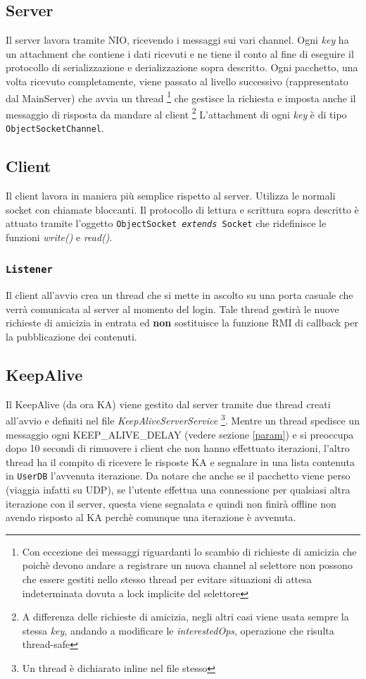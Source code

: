 \documentclass[]{article}
\begin{document}
\subsection{Server}
Il server lavora tramite NIO, ricevendo i messaggi sui vari channel. Ogni \textit{key} ha un attachment che contiene i dati ricevuti e ne tiene il conto al fine di eseguire il protocollo di serializzazione e derializzazione sopra descritto. Ogni pacchetto, una volta ricevuto completamente, viene passato al livello successivo (rappresentato dal MainServer) che avvia un thread \footnote{Con eccezione dei messaggi riguardanti lo scambio di richieste di amicizia che poichè devono andare a registrare un nuova channel al selettore non possono che essere gestiti nello stesso thread per evitare situazioni di attesa indeterminata dovuta a lock implicite del selettore} che gestisce la richiesta e imposta anche il messaggio di risposta da mandare al client \footnote{A differenza delle richieste di amicizia, negli altri casi viene usata sempre la stessa \textit{key}, andando a modificare le \textit{interestedOps}, operazione che risulta thread-safe}
L'attachment di ogni \textit{key} è di tipo \texttt{ObjectSocketChannel}.

\subsection{Client}
Il client lavora in maniera più semplice rispetto al server. Utilizza le normali socket con chiamate bloccanti. Il protocollo di lettura e scrittura sopra descritto è attuato tramite l'oggetto \texttt{ObjectSocket \textit{extends} Socket} che ridefinisce le funzioni \textit{write()} e \textit{read()}.
\subsubsection{\texttt{Listener}}
Il client all'avvio crea un thread che si mette in ascolto su una porta casuale che verrà comunicata al server al momento del login. Tale thread gestirà le nuove richieste di amicizia in entrata ed \textbf{non} sostituisce la funzione RMI di callback per la pubblicazione dei contenuti.

\subsection{KeepAlive}
Il KeepAlive (da ora KA) viene gestito dal server tramite due thread creati all'avvio e definiti nel file \textit{KeepAliveServerService} \footnote{Un thread è dichiarato inline nel file stesso}. Mentre un thread spedisce un messaggio ogni KEEP\_ALIVE\_DELAY (vedere sezione \ref{param}) e si preoccupa dopo 10 secondi di rimuovere i client che non hanno effettuato iterazioni, l'altro thread ha il compito di ricevere le risposte KA e segnalare in una lista contenuta in \texttt{UserDB} l'avvenuta iterazione. Da notare che anche se il pacchetto viene perso (viaggia infatti su UDP), se l'utente effettua una connessione per qualsiasi altra iterazione con il server, questa viene segnalata e quindi non finirà offline non avendo risposto al KA perchè comunque una iterazione è avvenuta.
\end{document}
